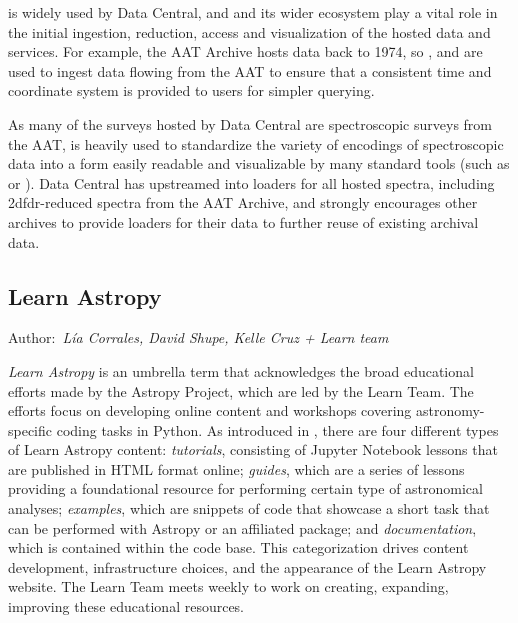 \documentclass[modern]{aastex631}
\newcommand{\secauthor}[1]{{\color{blue}Author:~\textit{#1}}}
\newcommand{\secunfilled}{{\color{red}Author:~\textit{Looking for volunteers!}}}
\begin{document}
\python is widely used by Data Central, and \astropy and its wider ecosystem
play a vital role in the initial ingestion, reduction, access and visualization
of the hosted data and services. For example, the AAT Archive hosts data back to
1974, so \astropycoordinates, \astropytime and \astropyfits are used to ingest
data flowing from the AAT to ensure that a consistent time and coordinate system
is provided to users for simpler querying.

As many of the surveys hosted by Data Central are spectroscopic surveys from the
AAT,  is heavily used to standardize the variety of encodings
of spectroscopic data into a form easily readable and visualizable by many
standard tools (such as  or ). Data Central has
upstreamed into  loaders for all hosted spectra, including
2dfdr-reduced spectra from the AAT Archive, and strongly encourages other
archives to provide loaders for their data to further reuse of existing archival
data.



\subsection{Learn Astropy} \label{sec:learn}

\secauthor{Lía Corrales, David Shupe, Kelle Cruz + Learn team}


\textit{Learn Astropy} is an umbrella term that acknowledges the broad
educational efforts made by the Astropy Project, which are led by the Learn
Team.
The efforts focus on developing online content and workshops covering
astronomy-specific coding tasks in Python.
As introduced in \citet{astropy:2018}, there are four different types of
Learn Astropy content: \textit{tutorials}, consisting of Jupyter Notebook
lessons that are published in HTML format online; \textit{guides}, which are a
series of lessons providing a foundational resource for performing certain
type of astronomical analyses; \textit{examples}, which are snippets of code
that showcase a short task that can be performed with Astropy or an affiliated
package; and \textit{documentation}, which is contained within the code base.
This categorization drives content development, infrastructure choices, and the
appearance of the Learn Astropy website.
The Learn Team meets weekly to work on creating, expanding, improving these
educational resources.
\end{document}
